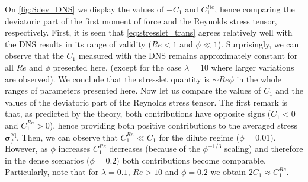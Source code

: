 On \ref{fig:Sdev_DNS} we display the values of $-C_1$ and $C_1^{Re}$, hence comparing the deviatoric part of the first moment of force and the Reynolds stress tensor, respectively. 
First, it is seen that \ref{eq:stresslet_trans} agrees relatively well with the DNS results in its range of validity ($Re < 1$ and $\phi \ll 1$). 
Surprisingly, we can observe that the $C_1$ measured with the DNS remains approximately constant for all $Re$ and $\phi$ presented here, (except for the case $\lambda = 10$ where larger variations are observed).
We conclude that the stresslet quantity is $\sim Re\phi$ in the whole ranges of parameters presented here. 
Now let us compare the values of $C_1$ and the values of the deviatoric part of the Reynolds stress tensor. 
The first remark is that, as predicted by the theory, both contributions have opposite signs ($C_1 <0$ and $C_1^{Re} > 0$), hence providing both positive contributions to the averaged stress $\bm\sigma_f^\text{eq}$. 
Then, we can observe that $C_1^{Re} \ll C_1$ for the dilute regime ($\phi =0.01$). 
However, as $\phi$ increases $C_1^{Re}$ decreases (because of the $\phi^{-1/3}$ scaling) and therefore in the dense scenarios ($\phi =0.2$) both contributions become comparable.
Particularly, note that for $\lambda = 0.1$, $Re >10$ and $\phi =0.2$ we obtain $2 C_1 \approx  C_1^{Re}$. 
